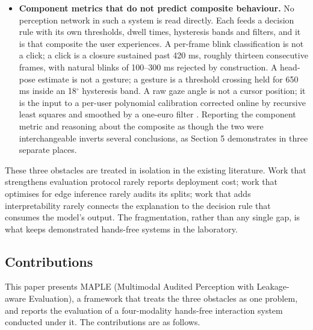 \begin{itemize}
\item \textbf{Component metrics that do not predict composite behaviour.} No perception network in such a system is read directly. Each feeds a decision rule with its own thresholds, dwell times, hysteresis bands and filters, and it is that composite the user experiences. A per-frame blink classification is not a click; a click is a closure sustained past 420 ms, roughly thirteen consecutive frames, with natural blinks of 100--300 ms rejected by construction. A head-pose estimate is not a gesture; a gesture is a threshold crossing held for 650 ms inside an 18$^{\circ}$ hysteresis band. A raw gaze angle is not a cursor position; it is the input to a per-user polynomial calibration corrected online by recursive least squares  and smoothed by a one-euro filter . Reporting the component metric and reasoning about the composite as though the two were interchangeable inverts several conclusions, as Section 5 demonstrates in three separate places.
\end{itemize}

These three obstacles are treated in isolation in the existing literature. Work that strengthens evaluation protocol rarely reports deployment cost; work that optimises for edge inference rarely audits its splits; work that adds interpretability rarely connects the explanation to the decision rule that consumes the model's output. The fragmentation, rather than any single gap, is what keeps demonstrated hands-free systems in the laboratory.

\FloatBarrier

\subsection{Contributions}

This paper presents MAPLE (Multimodal Audited Perception with Leakage-aware Evaluation), a framework that treats the three obstacles as one problem, and reports the evaluation of a four-modality hands-free interaction system conducted under it. The contributions are as follows.

